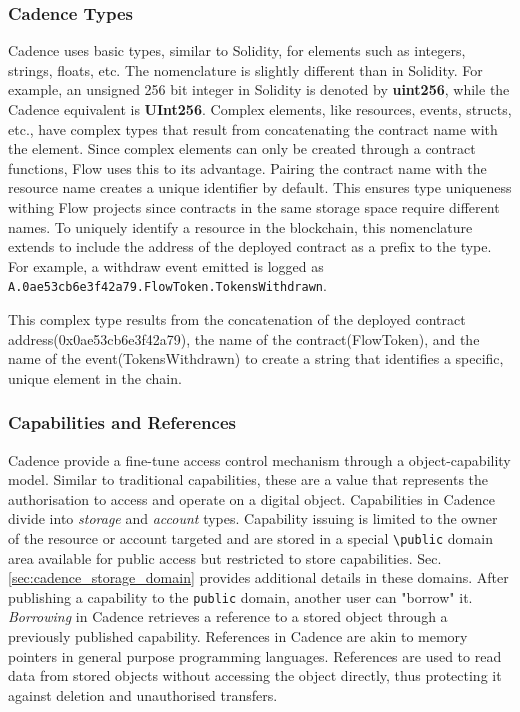 \documentclass[../NFTComp_IEEE.tex]{subfiles}
\begin{document}
\subsubsection{Cadence Types}
Cadence uses basic types, similar to Solidity, for elements such as integers, strings, floats, etc. The nomenclature is slightly different than in Solidity. For example, an unsigned 256 bit integer in Solidity is denoted by \textbf{uint256}, while the Cadence equivalent is \textbf{UInt256}. Complex elements, like resources, events, structs, etc., have complex types that result from concatenating the contract name with the element. Since complex elements can only be created through a contract functions, Flow uses this to its advantage. Pairing the contract name with the resource name creates a unique identifier by default. This ensures type uniqueness withing Flow projects since contracts in the same storage space require different names. To uniquely identify a resource in the blockchain, this nomenclature extends to include the address of the deployed contract as a prefix to the type. For example, a withdraw event emitted is logged as \verb|A.0ae53cb6e3f42a79.FlowToken.TokensWithdrawn|.
\par
This complex type results from the concatenation of the deployed contract address(0x0ae53cb6e3f42a79), the name of the contract(FlowToken), and the name of the event(TokensWithdrawn) to create a string that identifies a specific, unique element in the chain.

\subsubsection{Capabilities and References}
\label{sec:cadence_capabilities}
Cadence provide a fine-tune access control mechanism through a object-capability model. Similar to traditional capabilities, these are a value that represents the authorisation to access and operate on a digital object. Capabilities in Cadence divide into \textit{storage} and \textit{account} types. Capability issuing is limited to the owner of the resource or account targeted and are stored in a special \verb|\public| domain area available for public access but restricted to store capabilities. Sec. \ref{sec:cadence_storage_domain} provides additional details in these domains. After publishing a capability to the \verb|public| domain, another user can "borrow" it. \textit{Borrowing} in Cadence retrieves a reference to a stored object through a previously published capability. References in Cadence are akin to memory pointers in general purpose programming languages. References are used to read data from stored objects without accessing the object directly, thus protecting it against deletion and unauthorised transfers.
\end{document}
